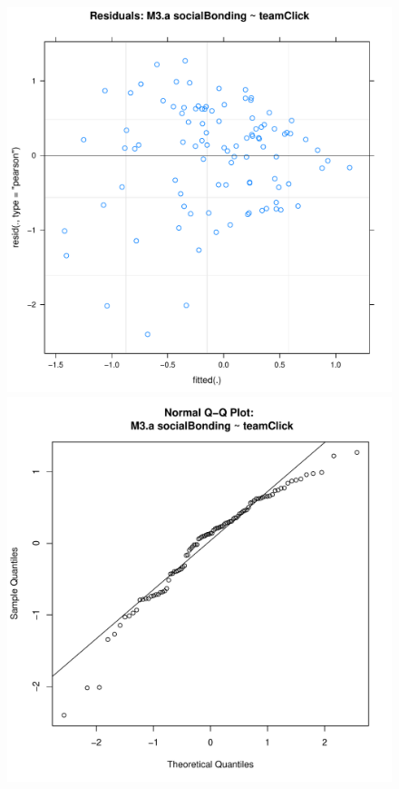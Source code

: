 {\begin{figure}[htbp]
        \includegraphics[scale =.4]{images/MLM3aScatter.pdf}
        \includegraphics[scale =.4]{images/MLM3aQQNorm.pdf}

\end{figure}}

